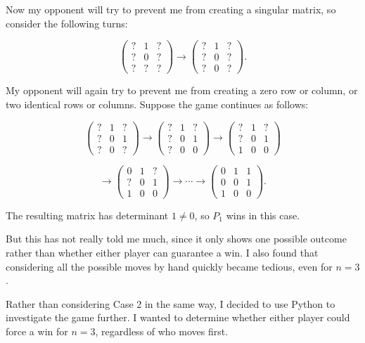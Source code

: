 \documentclass[11pt]{article}
\newcommand{\keywordfont}{\textsc}
\newcommand{\keyword}[1]{%
  \marginpar{\raggedright\small\keywordfont{#1}}}
\begin{document}
Now my opponent will try to prevent
me from creating a singular matrix,
so consider the following turns:

$$
\begin{pmatrix}
?&1&?\\
?&0&?\\
?&?&?
\end{pmatrix}
\rightarrow
\begin{pmatrix}
?&1&?\\
?&0&?\\
?&0&?
\end{pmatrix}.
$$

My opponent will again try to prevent
me from creating a zero row or column,
or two identical rows or columns.
Suppose the game continues as follows:

$$
\begin{pmatrix}
?&1&?\\
?&0&1\\
?&0&?
\end{pmatrix}
\rightarrow
\begin{pmatrix}
?&1&?\\
?&0&1\\
?&0&0
\end{pmatrix}
\rightarrow
\begin{pmatrix}
?&1&?\\
?&0&1\\
1&0&0
\end{pmatrix}
$$

$$
\rightarrow
\begin{pmatrix}
0&1&?\\
?&0&1\\
1&0&0
\end{pmatrix}
\rightarrow \cdots \rightarrow
\begin{pmatrix}
0&1&1\\
0&0&1\\
1&0&0
\end{pmatrix}.
$$

The resulting matrix has determinant
$1\neq0$, so $P_1$ wins in this case.

\medskip
\keyword{STUCK}

But this has not really told me
much, since it only shows one possible
outcome rather than whether either
player can guarantee a win.
I also found that considering all the
possible moves by hand quickly became
tedious, even for $n=3$.

\medskip
\keyword{IDEA}

Rather than considering Case 2 in the
same way, I decided to use Python to
investigate the game further.
I wanted to determine
whether either player could force a
win for $n=3$, regardless of who
moves first.
\end{document}
